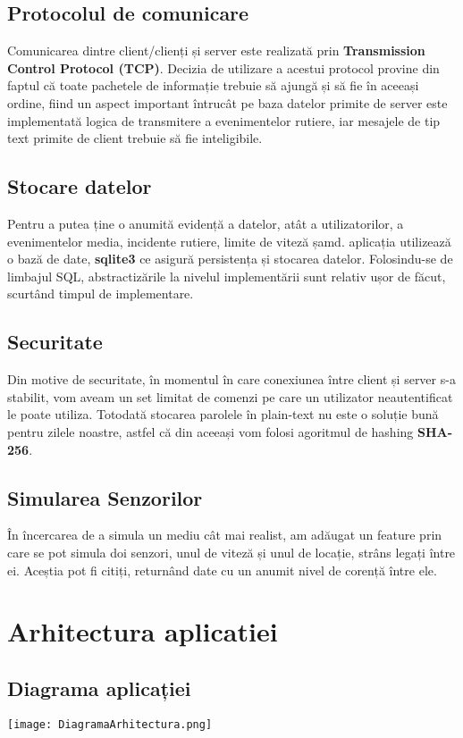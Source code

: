 \documentclass{article}
\begin{document}
\subsection{Protocolul de comunicare}
Comunicarea dintre client/clienți și server este realizată prin  \textbf{Transmission Control Protocol (TCP)}. Decizia de utilizare a acestui protocol provine din faptul că toate pachetele de informație trebuie să ajungă și să fie în aceeași ordine, fiind un aspect important întrucât pe baza datelor primite de server este implementată logica de transmitere a evenimentelor rutiere, iar  mesajele de tip text primite de client trebuie să fie inteligibile. 

\subsection{Stocare datelor}
Pentru a putea ține o anumită evidență a datelor, atât a utilizatorilor, a evenimentelor media, incidente rutiere, limite de viteză șamd. aplicația utilizează o bază de date, \textbf{sqlite3} ce asigură persistența și stocarea datelor. Folosindu-se de limbajul SQL, abstractizările la nivelul implementării sunt relativ ușor de făcut, scurtând timpul de implementare.

\subsection{Securitate}
Din motive de securitate, în momentul în care conexiunea între client și server s-a stabilit, vom aveam un set limitat de comenzi pe care un utilizator neautentificat le poate utiliza. Totodată stocarea parolele în plain-text nu este o soluție bună pentru zilele noastre, astfel că din aceeași vom folosi agoritmul de hashing \textbf{SHA-256}.

\subsection{Simularea Senzorilor}
În încercarea de a simula un mediu cât mai realist, am adăugat un feature prin care se pot simula doi senzori, unul de viteză și unul de locație, strâns legați între ei. Aceștia pot fi citiți, returnând date cu un anumit nivel de corență între ele.

\section{Arhitectura aplicatiei}
\subsection{Diagrama aplicației}
\texttt{[image: DiagramaArhitectura.png]}
\end{document}
